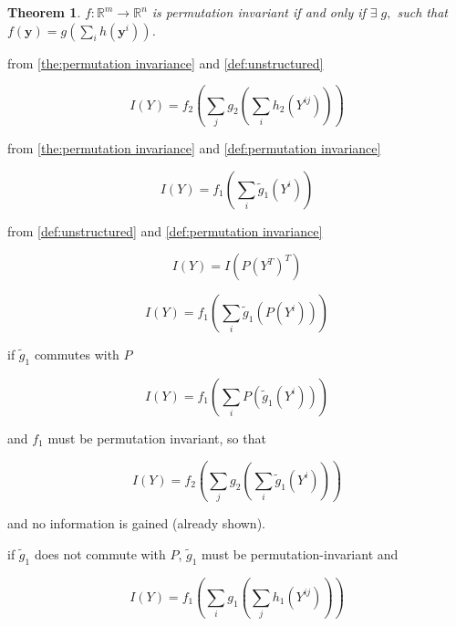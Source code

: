 \documentclass[sn-mathphys-num]{sn-jnl}%
\newcommand{\y}{\mathbf{y}}
\theoremstyle{thmstyleone}%
\newtheorem{theorem}{Theorem}%
\theoremstyle{thmstyletwo}%
\theoremstyle{thmstylethree}%
\begin{document}
\begin{appendices}
\begin{theorem}
    \label{the:permutation invariance}
    $f \colon \mathbb{R}^{m} \to \mathbb{R}^n$ is permutation invariant if and only if
    $\exists\; g, $ such that $f(\y) = g\left(\sum_i h(\y^i)\right)$.
\end{theorem}

from \autoref{the:permutation invariance} and \autoref{def:unstructured}

\begin{equation}
    I(Y) = f_2 \left( \sum_j g_2\left( \sum_i h_2(Y^{ij}) \right) \right)
\end{equation}

from \autoref{the:permutation invariance} and \autoref{def:permutation invariance}

\begin{equation}
    I(Y) = f_1 \left( \sum_i \tilde g_1(Y^{i}) \right)
\end{equation}

from \autoref{def:unstructured} and \autoref{def:permutation invariance}

\begin{equation}
    I(Y) = I(P(Y^T)^T)
\end{equation}

\begin{equation}
    I(Y) = f_1 \left( \sum_i \tilde g_1(P(Y^{i})) \right)
\end{equation}

if $\tilde g_1$ commutes with $P$

\begin{equation}
    I(Y) = f_1 \left( \sum_i P(\tilde g_1(Y^{i})) \right)
\end{equation}

and $f_1$ must be permutation invariant, so that

\begin{equation}
    I(Y) = f_2 \left( \sum_j g_2\left( \sum_i \tilde g_1(Y^{i}) \right)\right)
\end{equation}

and no information is gained (already shown).

if $\tilde g_1$ does not commute with $P$, $\tilde g_1$ must be permutation-invariant and

\begin{equation}
    I(Y) = f_1 \left( \sum_i g_1\left(\sum_j h_1(Y^{ij})\right) \right)
\end{equation}


\end{appendices}
\end{document}
